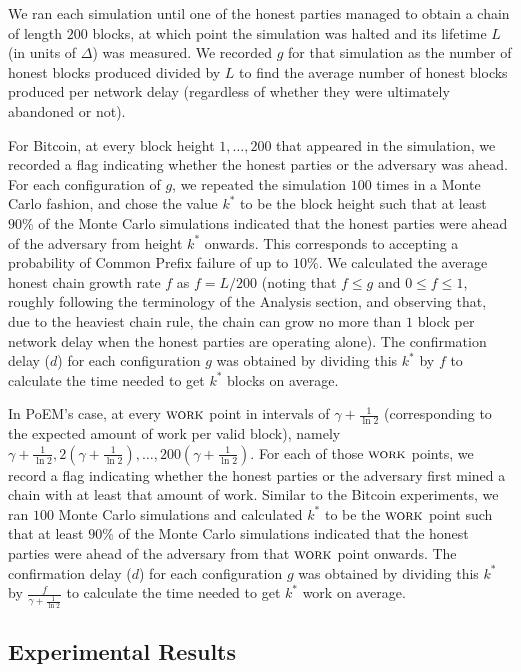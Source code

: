 We ran each simulation until one of the honest parties managed to obtain a chain of
length $200$ blocks, at which point the simulation was halted and its lifetime $L$
(in units of $\Delta$) was measured. We recorded $g$ for that simulation as the number
of honest blocks produced divided by $L$ to find the average number of honest blocks
produced per network delay (regardless of whether they were ultimately abandoned or not).

For Bitcoin, at every block height
$1, \ldots, 200$ that appeared in the simulation, we recorded a flag indicating whether
the honest parties or the adversary was ahead. For each configuration of $g$, we
repeated the simulation $100$ times in a Monte Carlo fashion, and chose the value
$k^*$ to be the block height such that at least $90\%$ of the Monte Carlo simulations
indicated that the honest parties were ahead of the adversary from height $k^*$
onwards. This corresponds to accepting a probability of Common Prefix failure of
up to $10\%$.
We calculated the average honest chain growth rate $f$ as $f = L / 200$
(noting that $f \leq g$ and $0 \leq f \leq 1$, roughly following the terminology
of the Analysis section, and observing that, due to the heaviest chain rule,
the chain can grow no more than $1$ block per network delay when the honest
parties are operating alone).
The confirmation delay ($d$) for each configuration $g$ was obtained by dividing
this $k^*$ by $f$ to calculate the time needed to get $k^*$ blocks on average.

In PoEM's case, at every $\textsc{work}$ point in intervals of $\gamma + \frac{1}{\ln2}$
(corresponding to the expected amount of work per valid block),
namely $\gamma + \frac{1}{\ln2}, 2\left(\gamma + \frac{1}{\ln2}\right), \ldots, 200\left(\gamma + \frac{1}{\ln2}\right)$.
For each of those $\textsc{work}$ points, we record a flag indicating whether the honest
parties or the adversary first mined a chain with at least that amount of work.
Similar to the Bitcoin experiments, we ran $100$ Monte Carlo simulations and
calculated $k^*$ to be the $\textsc{work}$ point such that at least $90\%$ of the
Monte Carlo simulations indicated that the honest parties were ahead of the
adversary from that $\textsc{work}$ point onwards. The confirmation delay ($d$) for
each configuration $g$ was obtained by dividing this $k^*$ by $\frac{f}{\gamma + \frac{1}{\ln2}}$
to calculate the time needed to get $k^*$ work on average.

\subsection{Experimental Results}\label{sec:results}


